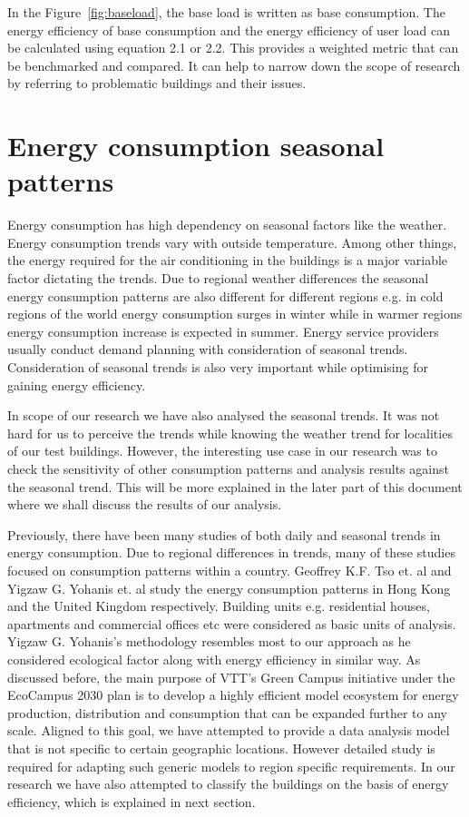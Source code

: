 In the Figure~\ref{fig:baseload}, the base load is written as base consumption. The energy efficiency of base consumption and the energy efficiency of user load can be calculated using equation 2.1 or 2.2. This provides a weighted metric that can be benchmarked and compared. It can help to narrow down the scope of research by referring to problematic buildings and their issues.

\section{Energy consumption seasonal patterns}\label{seasonal}
Energy consumption has high dependency on seasonal factors like the weather. Energy consumption trends vary with outside temperature. Among other things, the energy required for the air conditioning in the buildings is a major variable factor dictating the trends. Due to regional weather differences the seasonal energy consumption patterns are also different for different regions e.g. in cold regions of the world energy consumption surges in winter while in warmer regions energy consumption increase is expected in summer. Energy service providers usually conduct demand planning with consideration of seasonal trends. Consideration of seasonal trends is also very important while optimising for gaining energy efficiency. 

In scope of our research we have also analysed the seasonal trends. It was not hard for us to perceive the trends while knowing the weather trend for localities of our test buildings. However, the interesting use case in our research was to check the sensitivity of other consumption patterns and analysis results against the seasonal trend. This will be more explained in the later part of this document where we shall discuss the results of our analysis.

Previously, there have been many studies of both daily and seasonal trends in energy consumption. Due to regional differences in trends, many of these studies focused on consumption patterns within a country. Geoffrey K.F. Tso et. al \cite{tso2003study} and Yigzaw G. Yohanis et. al \cite{yohanis2008real} study the energy consumption patterns in  Hong Kong and the United Kingdom respectively. Building units e.g. residential houses, apartments and commercial offices etc were considered as basic units of analysis. Yigzaw G. Yohanis's methodology resembles most to our approach as he considered ecological factor along with energy efficiency in similar way. As discussed before, the main purpose of VTT's Green Campus initiative under the EcoCampus 2030 plan is to develop a highly efficient model ecosystem for energy production, distribution and consumption that can be expanded further to any scale. Aligned to this goal, we have attempted to provide a data analysis model that is not specific to certain geographic locations. However detailed study is required for adapting such generic models to region specific requirements. In our research we have also attempted to classify the buildings on the basis of energy efficiency, which is explained in next section.

